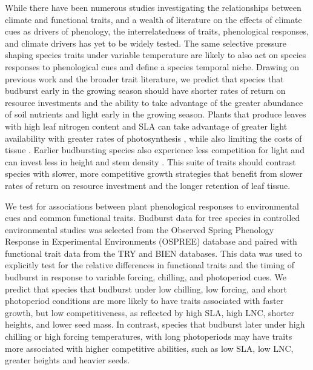 \documentclass{article}\usepackage[]{graphicx}\usepackage[]{color}
\begin{document}
While there have been numerous studies investigating the relationships between climate and functional traits, and a wealth of literature on the effects of climate cues as drivers of phenology, the interrelatedness of traits, phenological responses, and climate drivers has yet to be widely tested. The same selective pressure shaping species traits under variable temperature are likely to also act on species responses to phenological cues and define a species temporal niche. Drawing on previous work and the broader trait literature, we predict that species that budburst early in the growing season should have shorter rates of return on resource investments and the ability to take advantage of the greater abundance of soil nutrients and light early in the growing season. Plants that produce leaves with high leaf nitrogen content and SLA can take advantage of greater light availability with greater rates of photosynthesis \citep{Wright2004,Pereira2020}, while also limiting the costs of tissue \citep{Lambers2004, Westoby2006, Herault2011}. Earlier budbursting species also experience less competition for light and can invest less in height and stem density \citep{Laughlin2010}. This suite of traits should contrast species with slower, more competitive growth strategies that benefit from slower rates of return on resource investment and the longer retention of leaf tissue. 

We test for associations between plant phenological responses to environmental cues and common functional traits. Budburst data for tree species in controlled environmental studies was selected from the Observed Spring Phenology Response in Experimental Environments (OSPREE) database and paired with functional trait data from the TRY and BIEN databases. This data was used to explicitly test for the relative differences in functional traits and the timing of budburst in response to variable forcing, chilling, and photoperiod cues. We predict that species that budburst under low chilling, low forcing, and short photoperiod conditions are more likely to have traits associated with faster growth, but low competitiveness, as reflected by high SLA, high LNC, shorter heights, and lower seed mass. In contrast, species that budburst later under high chilling or high forcing temperatures, with long photoperiods  may have traits more associated with higher competitive abilities, such as low SLA, low LNC, greater heights and heavier seeds. 
\end{document}
